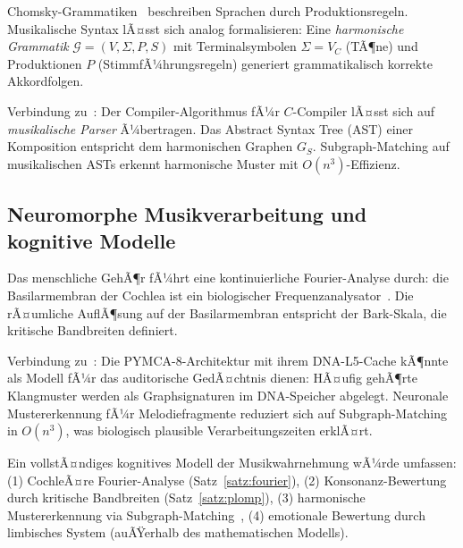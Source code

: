 ﻿\documentclass[a4paper,12pt]{article}
\theoremstyle{definition}
\begin{document}
Chomsky-Grammatiken~\cite{chomsky1957} beschreiben Sprachen durch Produktionsregeln.
Musikalische Syntax lÃ¤sst sich analog formalisieren: Eine \emph{harmonische
Grammatik} $\mathcal{G} = (V, \Sigma, P, S)$ mit Terminalsymbolen $\Sigma = V_C$
(TÃ¶ne) und Produktionen $P$ (StimmfÃ¼hrungsregeln) generiert grammatikalisch korrekte
Akkordfolgen.

Verbindung zu~\cite{epp2026ccl}: Der Compiler-Algorithmus fÃ¼r $C$-Compiler lÃ¤sst sich
auf \emph{musikalische Parser} Ã¼bertragen. Das Abstract Syntax Tree (AST) einer
Komposition entspricht dem harmonischen Graphen $G_S$. Subgraph-Matching auf
musikalischen ASTs erkennt harmonische Muster mit $O(n^3)$-Effizienz.

\subsection{Neuromorphe Musikverarbeitung und kognitive Modelle}

Das menschliche GehÃ¶r fÃ¼hrt eine kontinuierliche Fourier-Analyse durch:
die Basilarmembran der Cochlea ist ein biologischer Frequenzanalysator~\cite{epp2026brn}.
Die rÃ¤umliche AuflÃ¶sung auf der Basilarmembran entspricht der Bark-Skala,
die kritische Bandbreiten definiert.

Verbindung zu~\cite{epp2026pymca8}: Die PYMCA-8-Architektur mit ihrem DNA-L5-Cache
kÃ¶nnte als Modell fÃ¼r das auditorische GedÃ¤chtnis dienen: HÃ¤ufig gehÃ¶rte Klangmuster
werden als Graphsignaturen im DNA-Speicher abgelegt. Neuronale Mustererkennung
fÃ¼r Melodiefragmente reduziert sich auf Subgraph-Matching in $O(n^3)$, was
biologisch plausible Verarbeitungszeiten erklÃ¤rt.

Ein vollstÃ¤ndiges kognitives Modell der Musikwahrnehmung wÃ¼rde umfassen:
(1) CochleÃ¤re Fourier-Analyse (Satz~\ref{satz:fourier}), (2) Konsonanz-Bewertung
durch kritische Bandbreiten (Satz~\ref{satz:plomp}), (3) harmonische
Mustererkennung via Subgraph-Matching~\cite{epp2026subgraph},
(4) emotionale Bewertung durch limbisches System (auÃŸerhalb des mathematischen Modells).
\end{document}
